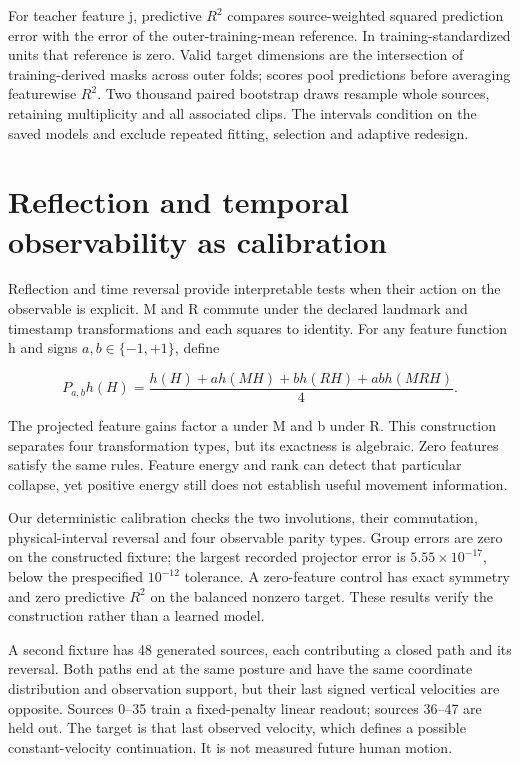 \documentclass{article}
\begin{document}
For teacher feature j, predictive \(R^2\) compares source-weighted squared prediction error with the error of the outer-training-mean reference. In training-standardized units that reference is zero. Valid target dimensions are the intersection of training-derived masks across outer folds; scores pool predictions before averaging featurewise \(R^2\). Two thousand paired bootstrap draws resample whole sources, retaining multiplicity and all associated clips. The intervals condition on the saved models and exclude repeated fitting, selection and adaptive redesign.

\section{Reflection and temporal observability as calibration}\label{reflection-and-temporal-observability-as-calibration}

Reflection and time reversal provide interpretable tests when their action on the observable is explicit. M and R commute under the declared landmark and timestamp transformations and each squares to identity. For any feature function h and signs \(a,b\in\{-1,+1\}\), define

\[
P_{a,b}h(H)=\frac{h(H)+a h(MH)+b h(RH)+ab h(MRH)}{4}.
\]

The projected feature gains factor a under M and b under R. This construction separates four transformation types, but its exactness is algebraic. Zero features satisfy the same rules. Feature energy and rank can detect that particular collapse, yet positive energy still does not establish useful movement information.

Our deterministic calibration checks the two involutions, their commutation, physical-interval reversal and four observable parity types. Group errors are zero on the constructed fixture; the largest recorded projector error is \(5.55\times10^{-17}\), below the prespecified \(10^{-12}\) tolerance. A zero-feature control has exact symmetry and zero predictive \(R^2\) on the balanced nonzero target. These results verify the construction rather than a learned model.

A second fixture has 48 generated sources, each contributing a closed path and its reversal. Both paths end at the same posture and have the same coordinate distribution and observation support, but their last signed vertical velocities are opposite. Sources 0--35 train a fixed-penalty linear readout; sources 36--47 are held out. The target is that last observed velocity, which defines a possible constant-velocity continuation. It is not measured future human motion.
\end{document}
